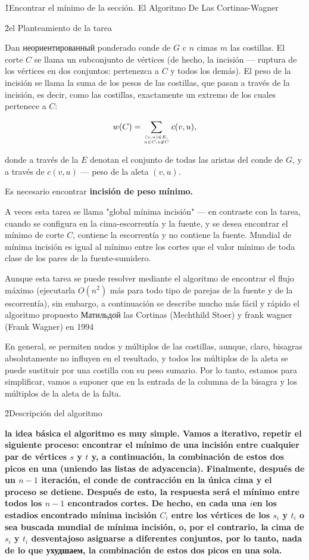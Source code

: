 \h1{Encontrar el mínimo de la sección. El Algoritmo De Las Cortinas-Wagner}


\h2{el Planteamiento de la tarea}

Dan неориентированный ponderado conde de $G$ c $n$ cimas $m$ las costillas. El corte $C$ se llama un subconjunto de vértices (de hecho, la incisión --- ruptura de los vértices en dos conjuntos: pertenezca a $C$ y todos los demás). El peso de la incisión se llama la suma de los pesos de las costillas, que pasan a través de la incisión, es decir, como las costillas, exactamente un extremo de los cuales pertenece a $C$:

$$ w(C) = \sum_{(v,u) \in E, \atop u \in C, v \not\in C} c(v,u), $$

donde a través de la $E$ denotan el conjunto de todas las aristas del conde de $G$, y a través de $c(v,u)$ --- peso de la aleta $(v,u)$.

Es necesario encontrar \bf{incisión de peso mínimo}.

A veces esta tarea se llama "global mínima incisión" --- en contraste con la tarea, cuando se configura en la cima-escorrentía y la fuente, y se desea encontrar el mínimo de corte $C$, contiene la escorrentía y no contiene la fuente. Mundial de mínima incisión es igual al mínimo entre los cortes que el valor mínimo de toda clase de los pares de la fuente-sumidero.

Aunque esta tarea se puede resolver mediante el algoritmo de encontrar el flujo máximo (ejecutarla $O(n^2)$ más para todo tipo de parejas de la fuente y de la escorrentía), sin embargo, a continuación se describe mucho más fácil y rápido el algoritmo propuesto Матильдой las Cortinas (Mechthild Stoer) y frank wagner (Frank Wagner) en 1994

En general, se permiten nudos y múltiplos de las costillas, aunque, claro, bisagras absolutamente no influyen en el resultado, y todos los múltiplos de la aleta se puede sustituir por una costilla con su peso sumario. Por lo tanto, estamos para simplificar, vamos a suponer que en la entrada de la columna de la bisagra y los múltiplos de la aleta de la falta.


\h2{Descripción del algoritmo}

\bf{la idea básica} el algoritmo es muy simple. Vamos a iterativo, repetir el siguiente proceso: encontrar el mínimo de una incisión entre cualquier par de vértices $s$ y $t$ y, a continuación, la combinación de estos dos picos en una (uniendo las listas de adyacencia). Finalmente, después de un $n-1$ iteración, el conde de contracción en la única cima y el proceso se detiene. Después de esto, la respuesta será el mínimo entre todos los $n-1$ encontrados cortes. De hecho, en cada una $i$en los estadios encontrado mínima incisión $C_i$ entre los vértices de los $s_i$ y $t_i$ o sea buscada mundial de mínima incisión, o, por el contrario, la cima de $s_i$ y $t_i$ desventajoso asignarse a diferentes conjuntos, por lo tanto, nada de lo que ухудшаем, la combinación de estos dos picos en una sola.

